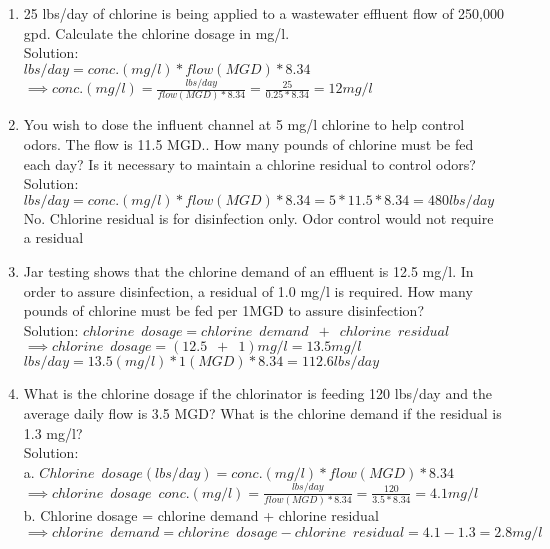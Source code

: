 \begin{enumerate}
\item 25 lbs/day of chlorine is being applied to a wastewater effluent flow of 250,000 gpd. Calculate the chlorine dosage in mg/l.\\
Solution:\\
$lbs/day=conc. (mg/l)*flow(MGD)*8.34$\\
$\implies conc. (mg/l)=\frac{lbs/day}{flow(MGD)*8.34}=\frac{25}{0.25*8.34}=\boxed{12mg/l}$
\item You wish to dose the influent channel at 5 mg/l chlorine to help control odors. The flow is 11.5 MGD.. How many pounds of chlorine must be fed each day? Is it necessary to maintain a chlorine residual to control odors?\\
Solution:\\
$lbs/day=conc. (mg/l)*flow(MGD)*8.34=5*11.5*8.34=\boxed{480lbs/day}$\\
No.  Chlorine residual is for disinfection only.  Odor control would not require a residual\\
\item Jar testing shows that the chlorine demand of an effluent is 12.5 mg/l. In order to assure disinfection, a residual of 1.0 mg/l is required. How many pounds of chlorine must be fed per 1MGD to assure disinfection?\\
Solution: 
$ chlorine \enspace dosage = chlorine \enspace demand \enspace + \enspace chlorine \enspace residual$\\
$\implies chlorine \enspace dosage = (12.5 \enspace + \enspace 1 )mg/l=13.5 mg/l$\\
$lbs/day=13.5(mg/l)*1(MGD)*8.34=\boxed{112.6 lbs/day}$
\item What is the chlorine dosage if the chlorinator is feeding 120 lbs/day and the average daily flow is 3.5 MGD?  What is the chlorine demand if the residual is 1.3 mg/l?\\
Solution:\\
a. $Chlorine \enspace dosage (lbs/day)=conc. (mg/l)*flow(MGD)*8.34$\\
$\implies chlorine \enspace dosage \enspace conc. (mg/l)=\frac{lbs/day}{flow(MGD)*8.34}=\frac{120}{3.5*8.34}=\boxed{4.1mg/l}$\\
b. Chlorine dosage = chlorine demand + chlorine residual\\
$ \implies chlorine \enspace demand = chlorine \enspace dosage - chlorine \enspace residual=4.1-1.3=\boxed{2.8mg/l}$


\end{enumerate}

